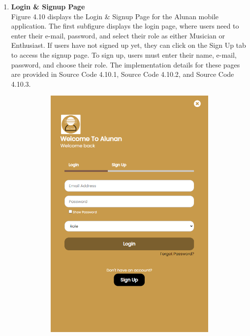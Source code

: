 \begin{enumerate}[1.]
    \item \textbf{Login \& Signup Page} \\
    Figure 4.10 displays the Login \& Signup Page for the Alunan mobile application. The first subfigure displays the login page, where users need to enter their e-mail, password, and select their role as either Musician or Enthusiast. If users have not signed up yet, they can click on the Sign Up tab to access the signup page. To sign up, users must enter their name, e-mail, password, and choose their role. The implementation details for these pages are provided in Source Code 4.10.1, Source Code 4.10.2, and Source Code 4.10.3.
    \begin{figure}[h]
        \centering
        \begin{subfigure}[b]{0.4\textwidth}
            \centering
            \includegraphics[width=\textwidth]{mainmatter/images/frontend/ss/Login-Signup.png}

\end{subfigure}
\end{figure}
\end{enumerate}
